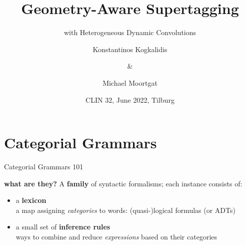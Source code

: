 \documentclass{beamer}
\begin{document}
\date{CLIN 32, June 2022, Tilburg}

\title[]{Geometry-Aware Supertagging}
\subtitle[]{with Heterogeneous Dynamic Convolutions}
\author{%
    Konstantinos Kogkalidis \and \& \and Michael Moortgat\\ 
}


{%
}




\section{Categorial Grammars}

\begin{frame}{Categorial Grammars 101}
    \smaller
    \begin{block}{\textbf{\smaller what are they?}}
    A \textbf{family} of syntactic formalisms; each instance consists of:
        \begin{itemize}
            \item a \textbf{lexicon}\\
            a map assigning \textit{categories} to words:
            (quasi-)logical formulas (or ADTs)
            \item a small set of \textbf{inference rules}\\
            ways to combine and reduce \textit{expressions} based on their categories 
        \end{itemize}
    \end{block}
\end{frame}
\end{document}

